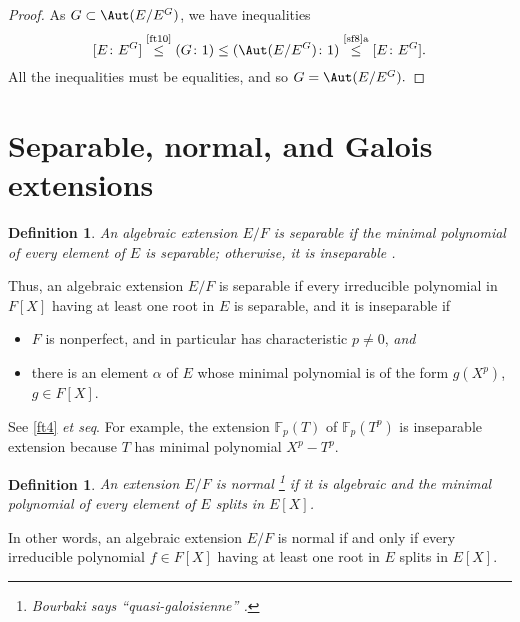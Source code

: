 \documentclass[a4paper,11pt,final,openany]{memoir}
\newtheorem{definition}[X]{Definition}
\theoremstyle{nonumberplain}
\newtheorem{proof}{Proof.}
\begin{document}
\begin{proof}
\noindent As $G\subset\Aut(E/E^{G})$, we have inequalities
\[
\lbrack E\colon E^{G}]\overset{\text{\ref{ft10}}}{\leq}(G\colon1)\leq
(\Aut(E/E^{G})\colon1)\overset{\text{\ref{sf8}a}}{\leq}[E\colon E^{G}].
\]
All the inequalities must be equalities, and so $G=\Aut(E/E^{G}).$
\end{proof}

\section{Separable, normal, and Galois extensions}

\begin{definition}
\label{ft10m}An algebraic extension $E/F$ is \emph{separable\/}%
if the minimal polynomial of every element of $E$ is separable; otherwise, it
is \emph{inseparable}%
%
.
\end{definition}

Thus, an algebraic extension $E/F$ is separable if every irreducible
polynomial in $F[X]$ having at least one root in $E$ is separable, and it is
inseparable if

\begin{itemize}
\item $F$ is nonperfect, and in particular has characteristic $p\neq0$,
\textit{and }

\item there is an element $\alpha$ of $E$ whose minimal polynomial is of the
form $g(X^{p})$, $g\in F[X]$.
\end{itemize}

\noindent See \ref{ft4} \textit{et seq}. For example, the extension
$\mathbb{F}_{p}(T)$ of $\mathbb{F}_{p}(T^{p})$ is inseparable extension
because $T$ has minimal polynomial $X^{p}-T^{p}$.

\begin{definition}
\label{ft10n}An extension $E/F$ is \emph{normal\/}%
%
\footnote{Bourbaki says \textquotedblleft quasi-galoisienne\textquotedblright%
.} if it is algebraic and the minimal polynomial of every element of $E$
splits in $E[X]$.
\end{definition}

In other words, an algebraic extension $E/F$ is normal if and only if every
irreducible polynomial $f\in F[X]$ having at least one root in $E$ splits in
$E[X]$.
\end{document}

